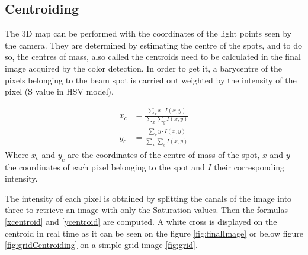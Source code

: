 \subsection{Centroiding}
\label{centroiding}

The 3D map can be performed with the coordinates of the light points seen by the camera. They are determined by estimating the centre of the spots, and to do so, the centres of mass, also called the centroids need to be calculated in the final image acquired by the color detection. In order to get it, a barycentre of the pixels belonging to the beam spot is carried out weighted by the intensity of the pixel (S value in HSV model).

\begin{align}
x_c &= \frac{\sum_x x \cdot I(x,y)}{\sum_x \sum_y I(x,y)} \label{xcentroid} \\
y_c &= \frac{\sum_y y \cdot I(x,y)}{\sum_x \sum_y I(x,y)} \label{ycentroid}
\end{align}
Where $x_c$ and $y_c$ are the coordinates of the centre of mass of the spot, $x$ and $y$ the coordinates of each pixel belonging to the spot and $I$ their corresponding intensity.

The intensity of each pixel is obtained by splitting the canals of the image into three to retrieve an image with only the Saturation values. Then the formulas \eqref{xcentroid} and \eqref{ycentroid} are computed. A white cross is displayed on the centroid in real time as it can be seen on the figure \ref{fig:finalImage} or below figure \ref{fig:gridCentroiding} on a simple grid image \ref{fig:grid}.

